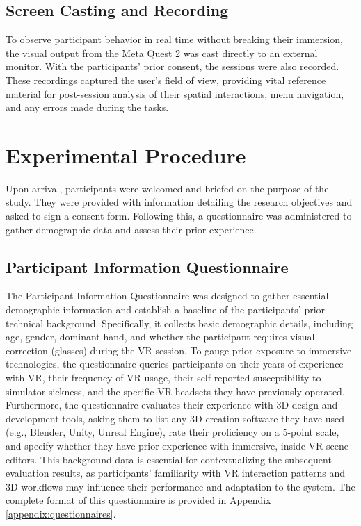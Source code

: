 \documentclass[inscr,ack,preface]{dithesis}
\begin{document}
\subsection{Screen Casting and Recording}
To observe participant behavior in real time without breaking their immersion, the visual output from the Meta Quest 2 was
cast directly to an external monitor. With the participants' prior consent, the sessions were also recorded.
These recordings captured the user's field of view, providing vital reference material for post-session analysis of their
spatial interactions, menu navigation, and any errors made during the tasks.

\section{Experimental Procedure}
Upon arrival, participants were welcomed and briefed on the purpose of the study.
They were provided with information detailing the research objectives and asked to sign a consent form.
Following this, a questionnaire was administered to gather demographic data and assess their prior experience.

\subsection{Participant Information Questionnaire}

The Participant Information Questionnaire was designed to gather essential demographic information
and establish a baseline of the participants' prior technical background.
Specifically, it collects basic demographic details, including age, gender, dominant hand, and
whether the participant requires visual correction (glasses) during the VR session.
To gauge prior exposure to immersive technologies,
the questionnaire queries participants on their years of experience with VR, their frequency of VR usage,
their self-reported susceptibility to simulator sickness, and the specific VR headsets they have previously operated.
Furthermore, the questionnaire evaluates their experience with 3D design and development tools,
asking them to list any 3D creation software they have used (e.g., Blender, Unity, Unreal Engine),
rate their proficiency on a 5-point scale, and specify whether they have prior experience with immersive, inside-VR scene editors.
This background data is essential for contextualizing the subsequent evaluation results, as participants'
familiarity with VR interaction patterns and 3D workflows may influence their performance and adaptation to the system.
The complete format of this questionnaire is provided in Appendix \ref{appendix:questionnaires}.
\end{document}
